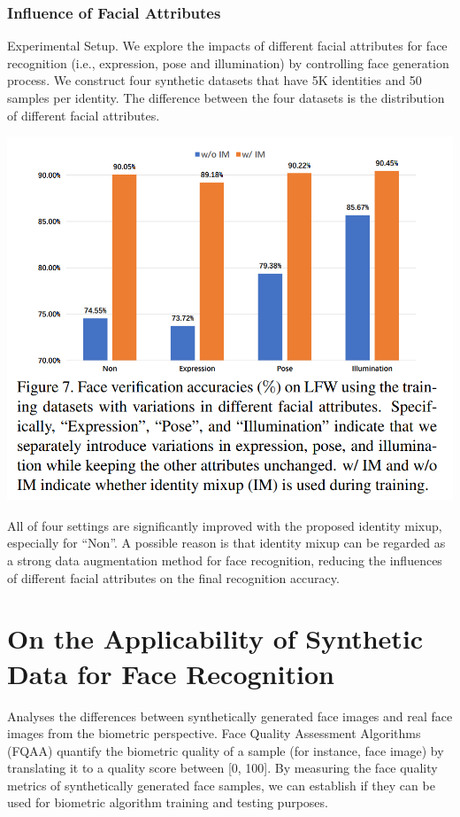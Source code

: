 \documentclass[12pt]{article}
\begin{document}
\subsubsection{Influence of Facial Attributes}
Experimental Setup. We explore the impacts of different facial attributes for face recognition (i.e., expression,
pose and illumination) by controlling face generation process. We construct four synthetic datasets that have 5K
identities and 50 samples per identity. The difference between the four datasets is the distribution of different facial attributes.
\begin{center}
  \includegraphics[scale = 1]{img8.png}
\end{center}
All of four
settings are significantly improved with the proposed identity mixup, especially for ``Non''. A possible reason is that
identity mixup can be regarded as a strong data augmentation method for face recognition, reducing the influences of
different facial attributes on the final recognition accuracy.
\section{On the Applicability of Synthetic Data for Face Recognition}
Analyses the differences between synthetically generated face images
and real face images from the biometric perspective. Face Quality Assessment Algorithms (FQAA)
quantify the biometric quality of a sample (for instance, face
image) by translating it to a quality score between [0, 100]. By measuring the face quality metrics of synthetically
generated face samples, we can establish if they can be
used for biometric algorithm training and testing purposes.
\end{document}
